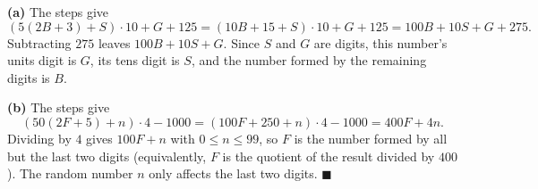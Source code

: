 \textbf{(a)} The steps give
\[\left(5(2B+3)+S\right)\cdot10+G+125=(10B+15+S)\cdot10+G+125=100B+10S+G+275.\]
Subtracting $275$ leaves $100B+10S+G$. Since $S$ and $G$ are digits, this number's units digit is $G$, its tens digit is $S$, and the number formed by the remaining digits is $B$.

\textbf{(b)} The steps give
\[\left(50(2F+5)+n\right)\cdot4-1000=(100F+250+n)\cdot4-1000=400F+4n.\]
Dividing by $4$ gives $100F+n$ with $0\le n\le99$, so $F$ is the number formed by all but the last two digits (equivalently, $F$ is the quotient of the result divided by $400$). The random number $n$ only affects the last two digits. $\blacksquare$
